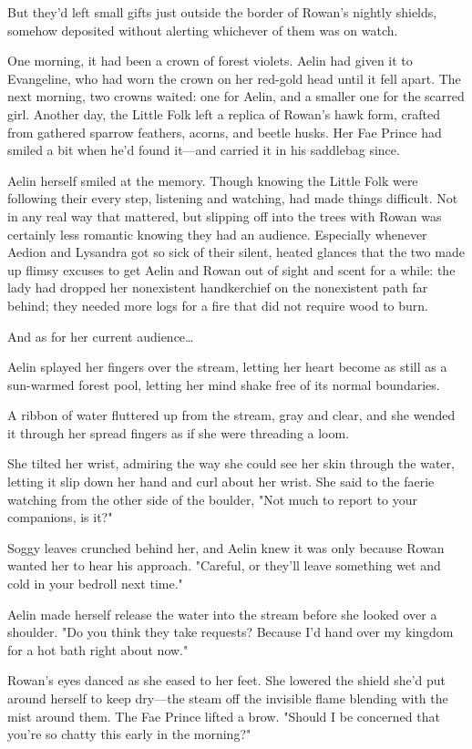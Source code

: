 But they'd left small gifts just outside the border of Rowan's nightly shields, somehow deposited without alerting whichever of them was on watch.

One morning, it had been a crown of forest violets.
Aelin had given it to Evangeline, who had worn the crown on her red-gold head until it fell apart.
The next morning, two crowns waited: one for Aelin, and a smaller one for the scarred girl.
Another day, the Little Folk left a replica of Rowan's hawk form, crafted from gathered sparrow feathers, acorns, and beetle husks.
Her Fae Prince had smiled a bit when he'd found it---and carried it in his saddlebag since.

Aelin herself smiled at the memory.
Though knowing the Little Folk were following their every step, listening and watching, had made things difficult.
Not in any real way that mattered, but slipping off into the trees with Rowan was certainly less romantic knowing they had an audience.
Especially whenever Aedion and Lysandra got so sick of their silent, heated glances that the two made up flimsy excuses to get Aelin and Rowan out of sight and scent for a while: the lady had dropped her nonexistent handkerchief on the nonexistent path far behind; they needed more logs for a fire that did not require wood to burn.

And as for her current audience\ldots{}

Aelin splayed her fingers over the stream, letting her heart become as still as a sun-warmed forest pool, letting her mind shake free of its normal boundaries.

A ribbon of water fluttered up from the stream, gray and clear, and she wended it through her spread fingers as if she were threading a loom.

She tilted her wrist, admiring the way she could see her skin through the water, letting it slip down her hand and curl about her wrist.
She said to the faerie watching from the other side of the boulder, "Not much to report to your companions, is it?"

Soggy leaves crunched behind her, and Aelin knew it was only because Rowan wanted her to hear his approach.
"Careful, or they'll leave something wet and cold in your bedroll next time."

Aelin made herself release the water into the stream before she looked over a shoulder.
"Do you think they take requests?
Because I'd hand over my kingdom for a hot bath right about now."

Rowan's eyes danced as she eased to her feet.
She lowered the shield she'd put around herself to keep dry---the steam off the invisible flame blending with the mist around them.
The Fae Prince lifted a brow.
"Should I be concerned that you're so chatty this early in the morning?"

